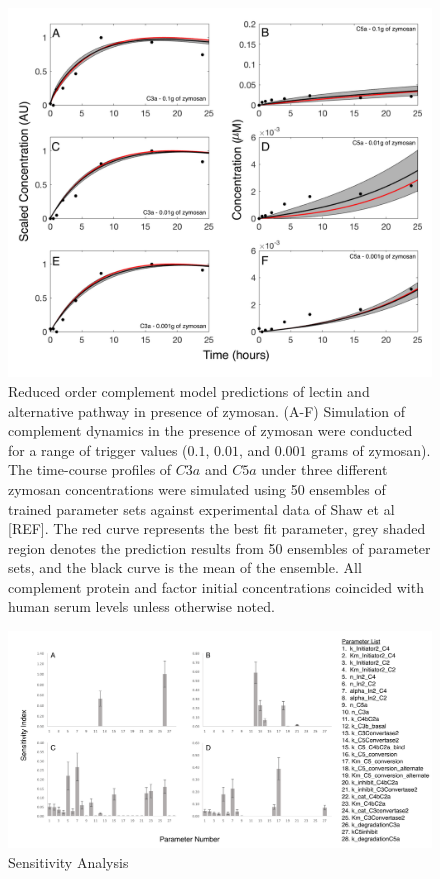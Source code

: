 \documentclass[12pt]{article}
\begin{document}
\begin{figure}[h]
\centering
\includegraphics[width=1.0\textwidth]{./Figures/Figure3_Predictions_2.pdf}
\caption{Reduced order complement model predictions of lectin and alternative pathway in presence of zymosan. (A-F) Simulation of complement dynamics in the presence of zymosan were conducted for a range of trigger values ($0.1$, $0.01$, and $0.001$ grams of zymosan). The time-course profiles of $C3a$ and $C5a$ under three different zymosan concentrations were simulated using 50 ensembles of trained parameter sets against experimental data of Shaw et al [REF].  The red curve represents the best fit parameter, grey shaded region denotes the prediction results from 50 ensembles of parameter sets, and the black curve is the mean of the ensemble. All complement protein and factor initial concentrations coincided with human serum levels unless otherwise noted.}
\end{figure}

\begin{figure}[h]
\centering
\includegraphics[width=1.0\textwidth]{./Figures/Figure4_Sensitivity_Analysis_v2.pdf}
\caption{Sensitivity Analysis}
\end{figure}
\end{document}
